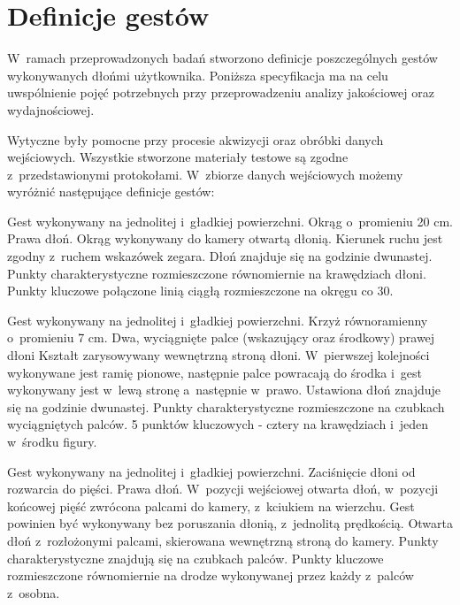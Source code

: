   \section{Definicje gestów}\label{Section_DefinicjeGestow}

    W~ramach przeprowadzonych badań stworzono definicje poszczególnych gestów wykonywanych dłońmi użytkownika. Poniższa specyfikacja ma na celu uwspólnienie pojęć potrzebnych przy przeprowadzeniu analizy jakościowej oraz wydajnościowej.

    Wytyczne były pomocne przy procesie akwizycji oraz obróbki danych wejściowych. Wszystkie stworzone materiały testowe są zgodne z~przedstawionymi protokołami. W~zbiorze danych wejściowych możemy wyróżnić następujące definicje gestów:

         {Gest wykonywany na jednolitej i~gładkiej powierzchni.}
         {Okrąg o~promieniu 20 cm.}
         {Prawa dłoń.}
         {Okrąg wykonywany do kamery otwartą dłonią.}
         {Kierunek ruchu jest zgodny z~ruchem wskazówek zegara.}
         {Dłoń znajduje się na godzinie dwunastej.}
         {Punkty charakterystyczne rozmieszczone równomiernie na krawędziach dłoni.}
         {Punkty kluczowe połączone linią ciągłą rozmieszczone na okręgu co 30\degree.}

    \newpage
         {Gest wykonywany na jednolitej i~gładkiej powierzchni.}
         {Krzyż równoramienny o~promieniu 7 cm.}
         {Dwa, wyciągnięte palce (wskazujący oraz środkowy) prawej dłoni}
         {Kształt zarysowywany wewnętrzną stroną dłoni.}
         {W~pierwszej kolejności wykonywane jest ramię pionowe, następnie palce powracają do środka i~gest wykonywany jest w~lewą stronę a~następnie w~prawo.}
         {Ustawiona dłoń znajduje się na godzinie dwunastej.}
         {Punkty charakterystyczne rozmieszczone na czubkach wyciągniętych palców.}
         {5 punktów kluczowych - cztery na krawędziach i~jeden w~środku figury.}

         {Gest wykonywany na jednolitej i~gładkiej powierzchni.}
         {Zaciśnięcie dłoni od rozwarcia do pięści.}
         {Prawa dłoń.}
         {W~pozycji wejściowej otwarta dłoń, w~pozycji końcowej pięść zwrócona palcami do kamery, z~kciukiem na wierzchu.}
         {Gest powinien być wykonywany bez poruszania dłonią, z~jednolitą prędkością.}
         {Otwarta dłoń z~rozłożonymi palcami, skierowana wewnętrzną stroną do kamery.}
         {Punkty charakterystyczne znajdują się na czubkach palców.}
         {Punkty kluczowe rozmieszczone równomiernie na drodze wykonywanej przez każdy z~palców z~osobna.}

